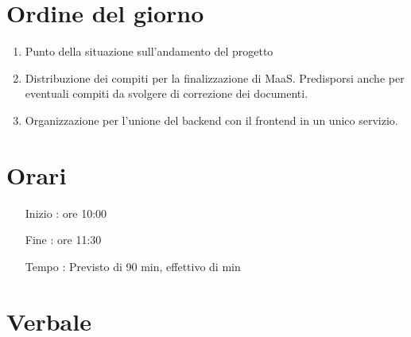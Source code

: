 \documentclass[11pt]{meetingmins}
\begin{document}
\maketitle

\section{Ordine del giorno}

\begin{enumerate}

\item Punto della situazione sull'andamento del progetto
\item Distribuzione dei compiti per la finalizzazione di MaaS. Predisporsi anche per eventuali compiti da svolgere di correzione dei documenti.
\item Organizzazione per l'unione del backend con il frontend in un unico servizio.

\end{enumerate}

\section{Orari}

\begin{itemize}
\item[Inizio]: ore 10:00
\item[Fine]: ore 11:30
\item[Tempo]: Previsto di 90 min, effettivo di  min

\end{itemize}

\section{Verbale}

\end{document}
